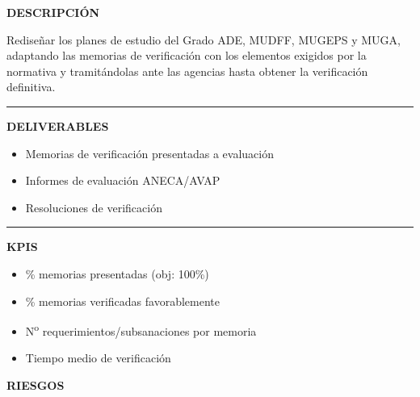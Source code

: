 \documentclass[11pt,a4paper]{scrreprt}
\newcommand{\fieldlabel}[1]{%
  {\footnotesize\sffamily\bfseries\color{mutedcolor}\MakeUppercase{#1}}\par\nopagebreak[4]
}
\newcommand{\fieldsep}{\vspace{3pt}\noindent\textcolor{bordercolor}{\rule{\linewidth}{0.4pt}}\vspace{3pt}\par}
\begin{document}
\begin{tcolorbox}[pabox={aacolor}{PA1.2 \enspace\textbullet\enspace Rediseño de los planes de estudio y memorias de verificación}]

\fieldlabel{Descripci\'on}
{\small Rediseñar los planes de estudio del Grado ADE, MUDFF, MUGEPS y MUGA, adaptando las memorias de verificación con los elementos exigidos por la normativa y tramitándolas ante las agencias hasta obtener la verificación definitiva.}\par
\fieldsep
\fieldlabel{Deliverables}
{\small \begin{itemize}[noitemsep,topsep=2pt]
\item Memorias de verificación presentadas a evaluación
\item Informes de evaluación ANECA/AVAP
\item Resoluciones de verificación
\end{itemize}}\par
\fieldsep
\fieldlabel{KPIs}
{\small \begin{itemize}[noitemsep,topsep=2pt]
\item \% memorias presentadas (obj: 100\%)
\item \% memorias verificadas favorablemente
\item N\textsuperscript{o} requerimientos/subsanaciones por memoria
\item Tiempo medio de verificación
\end{itemize}}\par
\end{tcolorbox}
\begin{tcolorbox}[riskbox]
{\footnotesize\sffamily\bfseries\color{red!50!black} RIESGOS}\par{}
\end{tcolorbox}
\end{document}
